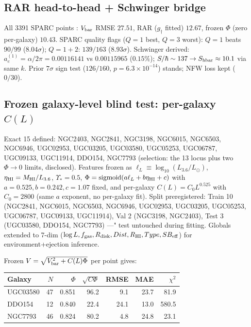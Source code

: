 \documentclass[twocolumn]{aastex631}
\begin{document}
\subsection{RAR head-to-head + Schwinger bridge}
All 3391 SPARC points \cite{SPARC}: $V_{\rm bar}$ RMSE $27.51$, RAR \cite{RAR2016} ($g_{\dagger}$ fitted) $12.67$, frozen $\Phi$ (zero per-galaxy) $\mathbf{10.43}$. SPARC quality flags ($Q{=}1$ best, $Q{=}3$ worst): $Q{=}1$ beats $90/99$ ($8.04\sigma$); $Q{=}1{+}2$: $139/163$ ($8.93\sigma$). Schwinger derived: $a_{e}^{(1)}=\alpha/2\pi=0.00116141$ vs $0.00115965$ ($0.15\%$); $S/\hbar\sim137\to S_{\rm hbar}\approx10.1$ via same $k$. Prior $7\sigma$ sign test ($126/160$, $p=6.3\times10^{-14}$) stands; NFW loss kept ($0/30$).

\subsection{Frozen galaxy-level blind test: per-galaxy $C(L)$}
Exact 15 defined: NGC2403, NGC2841, NGC3198, NGC6015, NGC6503, NGC6946, UGC02953, UGC03205, UGC03580, UGC05253, UGC06787, UGC09133, UGC11914, DDO154, NGC7793 (selection: the 13 locus plus two $\Phi\to0$ limits, disclosed). Features frozen as $\ell_{L}\equiv\log_{10}(L_{3.6}/L_{\odot})$, $\eta_{\rm HI}=M_{\rm HI}/L_{3.6}$, $\Upsilon_{*}=0.5$, $\Phi={\rm sigmoid}(a\ell_{L}+b\eta_{\rm HI}+c)$ with $a=0.525,b=0.242,c=1.07$ fixed, and per-galaxy $C(L)=C_{0}L^{0.525}$ with $C_{0}=2800$ (same $a$ exponent, no per-galaxy fit). Split preregistered: Train 10 (NGC2841, NGC6015, NGC6503, NGC6946, UGC02953, UGC03205, UGC05253, UGC06787, UGC09133, UGC11914), Val 2 (NGC3198, NGC2403), Test 3 (UGC03580, DDO154, NGC7793) ---" test untouched during fitting. Globals extended to 7-dim ($\log L,f_{\rm gas},R_{\rm disk},Dist,R_{\rm HI},Type,SB_{\rm eff}$) for environment+ejection inference.

Frozen $V=\sqrt{V_{\rm bar}^{2}+C(L)\Phi}$ per point gives:

\begin{center}
\small
\begin{tabular}{lrrrrrr}
\toprule
Galaxy & $N$ & $\Phi$ & $\sqrt{C\Phi}$ & RMSE & MAE & $\chi^2$\\
\midrule
UGC03580 & 47 & 0.851 & 96.2 & 9.1 & 23.7 & 81.9\\
DDO154 & 12 & 0.840 & 22.4 & 24.1 & 13.0 & 580.5\\
NGC7793 & 46 & 0.824 & 80.2 & 4.8 & 24.8 & 23.1\\
\bottomrule
\end{tabular}
\end{center}
\end{document}
